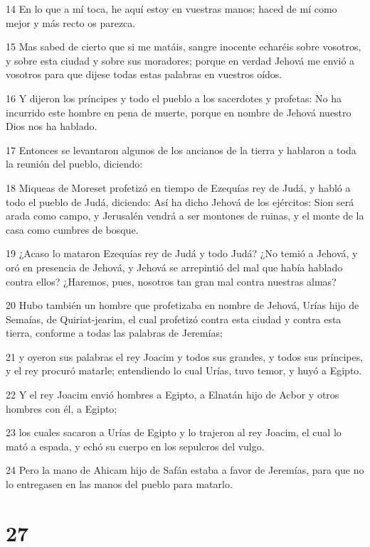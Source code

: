 \par 14 En lo que a mí toca, he aquí estoy en vuestras manos; haced de mí como mejor y más recto os parezca.
\par 15 Mas sabed de cierto que si me matáis, sangre inocente echaréis sobre vosotros, y sobre esta ciudad y sobre sus moradores; porque en verdad Jehová me envió a vosotros para que dijese todas estas palabras en vuestros oídos.
\par 16 Y dijeron los príncipes y todo el pueblo a los sacerdotes y profetas: No ha incurrido este hombre en pena de muerte, porque en nombre de Jehová nuestro Dios nos ha hablado.
\par 17 Entonces se levantaron algunos de los ancianos de la tierra y hablaron a toda la reunión del pueblo, diciendo:
\par 18 Miqueas de Moreset profetizó en tiempo de Ezequías rey de Judá, y habló a todo el pueblo de Judá, diciendo: Así ha dicho Jehová de los ejércitos: Sion será arada como campo, y Jerusalén vendrá a ser montones de ruinas, y el monte de la casa como cumbres de bosque. 
\par 19 ¿Acaso lo mataron Ezequías rey de Judá y todo Judá? ¿No temió a Jehová, y oró en presencia de Jehová, y Jehová se arrepintió del mal que había hablado contra ellos? ¿Haremos, pues, nosotros tan gran mal contra nuestras almas?
\par 20 Hubo también un hombre que profetizaba en nombre de Jehová, Urías hijo de Semaías, de Quiriat-jearim, el cual profetizó contra esta ciudad y contra esta tierra, conforme a todas las palabras de Jeremías;
\par 21 y oyeron sus palabras el rey Joacim y todos sus grandes, y todos sus príncipes, y el rey procuró matarle; entendiendo lo cual Urías, tuvo temor, y huyó a Egipto.
\par 22 Y el rey Joacim envió hombres a Egipto, a Elnatán hijo de Acbor y otros hombres con él, a Egipto;
\par 23 los cuales sacaron a Urías de Egipto y lo trajeron al rey Joacim, el cual lo mató a espada, y echó su cuerpo en los sepulcros del vulgo.
\par 24 Pero la mano de Ahicam hijo de Safán estaba a favor de Jeremías, para que no lo entregasen en las manos del pueblo para matarlo. 


\chapter{27}

